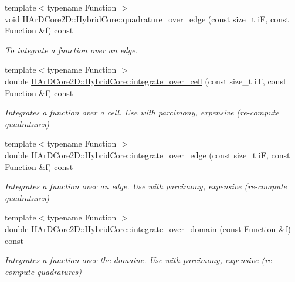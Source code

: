 \begin{DoxyCompactItemize}
\mbox{\label{group__HybridCore_gafbf9c61f2d929331197ba971b52b8710}} 
{\footnotesize template$<$typename Function $>$ }\\void \hyperlink{group__HybridCore_gafbf9c61f2d929331197ba971b52b8710}{H\+Ar\+D\+Core2\+D\+::\+Hybrid\+Core\+::quadrature\+\_\+over\+\_\+edge} (const size\+\_\+t iF, const Function \&f) const
\begin{DoxyCompactList}\small\item\em To integrate a function over an edge. \end{DoxyCompactList}\item 
\mbox{\label{group__HybridCore_ga64ffbc44306e06018efe3cea5a62f652}} 
{\footnotesize template$<$typename Function $>$ }\\double \hyperlink{group__HybridCore_ga64ffbc44306e06018efe3cea5a62f652}{H\+Ar\+D\+Core2\+D\+::\+Hybrid\+Core\+::integrate\+\_\+over\+\_\+cell} (const size\+\_\+t iT, const Function \&f) const
\begin{DoxyCompactList}\small\item\em Integrates a function over a cell. Use with parcimony, expensive (re-\/compute quadratures) \end{DoxyCompactList}\item 
\mbox{\label{group__HybridCore_ga03f276ea9c905d64662c39b7555d560c}} 
{\footnotesize template$<$typename Function $>$ }\\double \hyperlink{group__HybridCore_ga03f276ea9c905d64662c39b7555d560c}{H\+Ar\+D\+Core2\+D\+::\+Hybrid\+Core\+::integrate\+\_\+over\+\_\+edge} (const size\+\_\+t iF, const Function \&f) const
\begin{DoxyCompactList}\small\item\em Integrates a function over an edge. Use with parcimony, expensive (re-\/compute quadratures) \end{DoxyCompactList}\item 
\mbox{\label{group__HybridCore_gab058c4e54d1e33c49e537b8d0f602848}} 
{\footnotesize template$<$typename Function $>$ }\\double \hyperlink{group__HybridCore_gab058c4e54d1e33c49e537b8d0f602848}{H\+Ar\+D\+Core2\+D\+::\+Hybrid\+Core\+::integrate\+\_\+over\+\_\+domain} (const Function \&f) const
\begin{DoxyCompactList}\small\item\em Integrates a function over the domaine. Use with parcimony, expensive (re-\/compute quadratures) \end{DoxyCompactList}\item 

\end{DoxyCompactItemize}
